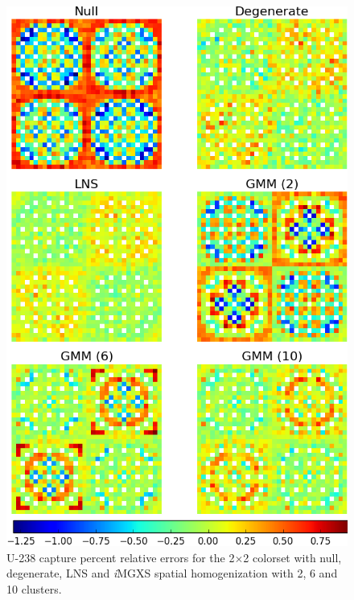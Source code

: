 \begin{figure}[h!]
\centering
\includegraphics[width=0.9\linewidth]{figures/results/spatial/2x2/capt-err}
\vspace{2mm}
\caption[U-238 capture errors for the 2$\times$2 colorset]{U-238 capture percent relative errors for the 2$\times$2 colorset with null, degenerate, \ac{LNS} and \textit{i}\ac{MGXS} spatial homogenization with 2, 6 and 10 clusters.}
\label{fig:chap11-2x2-capt-err}
\end{figure}

\clearpage


